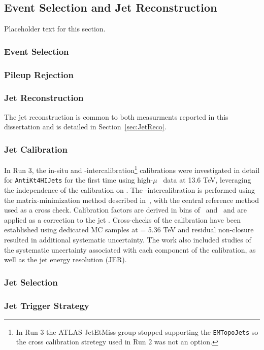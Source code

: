 \subsection{Event Selection and Jet Reconstruction}

Placeholder text for this section.
\subsubsection{Event Selection}
\subsubsection{Pileup Rejection}
\subsubsection{Jet Reconstruction}
The jet reconstruction is common to both measurments reported in this dissertation and is detailed in Section~\ref{sec:JetReco}.
\subsubsection{Jet Calibration}
In Run 3, the in-situ and \ETA-intercalibration\footnote{In Run 3 the ATLAS JetEtMiss group stopped supporting the \texttt{EMTopoJets} so the cross calibration stretegy used in Run 2 was not an option. } calibrations were investigated in detail for \texttt{AntiKt4HIJets} for the first time using high-$\mu$ \pxp\ data at 13.6 TeV, leveraging the independence of the calibration on \SNN.
The \ETA-intercalibration is performed using the matrix-minimization method described in~\cite{BanerjeeAQP}, with the central reference method used as a cross check.
Calibration factors are derived in bins of \PT\ and \ETA\ and are applied as a correction to the jet \PT.
Cross-checks of the calibration have been established using dedicated MC samples at \SNN = 5.36 TeV and residual non-closure resulted in additional systematic uncertainty.
The work also included studies of the systematic uncertainty associated with each component of the calibration, as well as the jet energy resolution (JER).
\subsubsection{Jet Selection}
\subsubsection{Jet Trigger Strategy}
